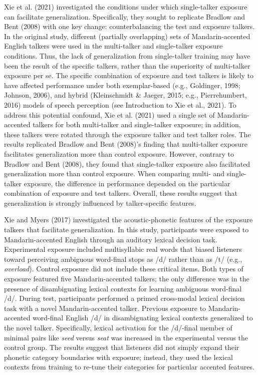 \documentclass[
  12pt,
  twoside]{article}
\begin{document}
Xie et al. (2021) investigated the conditions under which single-talker exposure can facilitate generalization.
Specifically, they sought to replicate Bradlow and Bent (2008) with one key change: counterbalancing the test and exposure talkers.
In the original study, different (partially overlapping) sets of Mandarin-accented English talkers were used in the multi-talker and single-talker exposure conditions.
Thus, the lack of generalization from single-talker training may have been the result of the specific talkers, rather than the superiority of multi-talker exposure per se.
The specific combination of exposure and test talkers is likely to have affected performance under both exemplar-based (e.g., Goldinger, 1998; Johnson, 2006), and hybrid (Kleinschmidt \& Jaeger, 2015; e.g., Pierrehumbert, 2016) models of speech perception (see Introduction to Xie et al., 2021).
To address this potential confound, Xie et al. (2021) used a single set of Mandarin-accented talkers for both multi-talker and single-talker exposure; in addition, these talkers were rotated through the exposure talker and test talker roles.
The results replicated Bradlow and Bent (2008)'s finding that multi-talker exposure facilitates generalization more than control exposure.
However, contrary to Bradlow and Bent (2008), they found that single-talker exposure also facilitated generalization more than control exposure.
When comparing multi- and single-talker exposure, the difference in performance depended on the particular combination of exposure and test talkers.
Overall, these results suggest that generalization is strongly influenced by talker-specific features.

Xie and Myers (2017) investigated the acoustic-phonetic features of the exposure talkers that facilitate generalization.
In this study, participants were exposed to Mandarin-accented English through an auditory lexical decision task.
Experimental exposure included multisyllabic real words that biased listeners toward perceiving ambiguous word-final stops as /d/ rather than as /t/ (e.g., \emph{overload}).
Control exposure did not include these critical items.
Both types of exposure featured five Mandarin-accented talkers; the only difference was in the presence of disambiguating lexical contexts for learning ambiguous word-final /d/.
During test, participants performed a primed cross-modal lexical decision task with a novel Mandarin-accented talker.
Previous exposure to Mandarin-accented word-final English /d/ in disambiguating lexical contexts generalized to the novel talker.
Specifically, lexical activation for the /d/-final member of minimal pairs like \emph{seed} versus \emph{seat} was increased in the experimental versus the control group.
The results suggest that listeners did not simply expand their phonetic category boundaries with exposure; instead, they used the lexical contexts from training to re-tune their categories for particular accented features.
\end{document}
